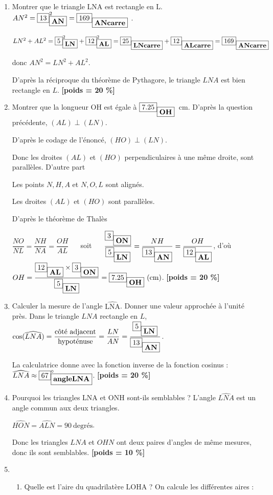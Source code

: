 \documentclass[10pt,a4paper]{article}
\newcommand{\poids}[1]{ {\bf [poids = #1 \%]}}
\newcommand{\var}[2]{\fbox{#2}_{\fbox{\mbox{\bf #1}}}}
\begin{document}
\begin{enumerate}
\item 
Montrer que le triangle LNA est rectangle en L.
$ AN^{2} = \var{AN}{13}^{2} =  \var{ANcarre}{169}$ .

$LN^{2} + AL^{2} = \var{LN}{5}^{2} + \var{AL}{12}^{2} =\var{LNcarre}{25} + \var{ALcarre}{12}= \var{ANcarre}{169}$

donc $AN^{2} = LN^{2} + AL^{2}$.

D'après la réciproque du théorème de Pythagore, le triangle $LNA$ est bien rectangle en $L$. 
\poids{20} %
\item 
Montrer que la longueur OH est égale à $\var{OH}{7.25}$~cm.
D'après la question précédente, $(AL) \perp (LN)$.

D'après le codage de l'énoncé, $(HO) \perp (LN)$.

Donc les droites $(AL)$ et $(HO)$ perpendiculaires à une même droite,
sont parallèles. D'autre part

Les points $N,H,A $ et $N, O, L $ sont alignés.

Les droites $(AL)$ et $(HO)$ sont parallèles.

D'après le théorème de Thalès

\(\displaystyle	\dfrac{NO}{NL}=\dfrac{NH}{NA}=\dfrac{OH}{AL}\) ~~ soit ~~ \(\displaystyle	\dfrac{\var{ON}{3}}{\var{LN}{5}}= \dfrac{NH}{\var{AN}{13}}=\dfrac{OH}{\var{AL}{12}}\),  d'où ~~\(\displaystyle OH = \dfrac{\var{AL}{12} \times \var{ON}{3}}{\var{LN}{5}}  = \var{OH}{7.25}~(\text{cm}) \).
\poids{20} %

\item 
Calculer la mesure de l'angle $\widehat{\text{LNA}}$. Donner une valeur approchée à l'unité près. 
Dans le triangle $ LNA $ rectangle en $ L $, 
\(\displaystyle \cos({\widehat{LNA}})=\dfrac{\text{côté adjacent}}{\text{hypoténuse}}=\dfrac{LN}{AN}= \dfrac{\var{LN}{5}}{\var{AN}{13}}\).

La calculatrice donne avec la fonction inverse de la fonction cosinus : $\widehat{LNA} \approx \var{angleLNA}{67}^\circ$.
\poids{20} %
\item 
Pourquoi les triangles LNA et ONH sont-ils semblables ?
L'angle $\widehat{LNA}$ est un angle commun aux deux triangles.
	
$\widehat{HON}=\widehat{ALN}=90 ~ \text{degrés}$.

Donc les triangles $ LNA $ et $ OHN $ ont deux paires d'angles de même mesures, donc ils sont semblables.
\poids{10} %
\item 
\begin{enumerate}
\item 
Quelle est l'aire du quadrilatère LOHA ?
 On calcule les différentes aires :


\end{enumerate}
\end{enumerate}
\end{document}
